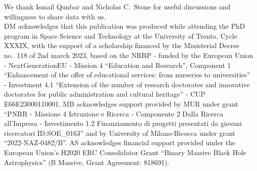 \documentclass[desactivate]{aa}
\newcommand{\dm}[1]{\textcolor{teal}{DM: #1}}
\newcommand{\as}[1]{\textcolor{red}{AS: #1}}
\begin{document}

\begin{acknowledgements}
    We thank Ismail Qunbar and Nicholas C.\ Stone for useful discussions and willingness to share data with us. \\
    DM acknowledges that this publication was produced while attending the PhD program in Space Science and Technology at the University of Trento, Cycle XXXIX, with the support of a scholarship financed by the Ministerial Decree no.\ 118 of 2nd march 2023, based on the NRRP - funded by the European Union - NextGenerationEU - Mission 4 ``Education and Research'', Component 1 ``Enhancement of the offer of educational services: from nurseries to universities'' - Investment 4.1 ``Extension of the number of research doctorates and innovative doctorates for public administration and cultural heritage'' - CUP E66E23000110001. MB acknowledges support provided by MUR under grant ``PNRR - Missione 4 Istruzione e Ricerca - Componente 2 Dalla Ricerca all'Impresa - Investimento 1.2 Finanziamento di progetti presentati da giovani ricercatori ID:SOE\_0163'' and by University of Milano-Bicocca under grant ``2022-NAZ-0482/B''. AS acknowledges financial support provided under the European Union’s H2020 ERC Consolidator Grant ``Binary Massive Black Hole Astrophysics'' (B Massive, Grant Agreement: 818691).
\end{acknowledgements}


\end{document}
